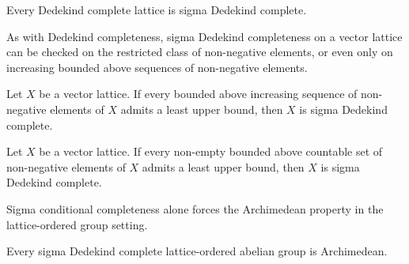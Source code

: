 \begin{lemma}
\label{lem:conditionallyCompleteLattice-toSigmaConditionallyCompleteLattice}
\leanok
{}
Every Dedekind complete lattice is sigma Dedekind complete.
\end{lemma}

As with Dedekind completeness, sigma Dedekind completeness on a
vector lattice can be checked on the restricted class of non-negative
elements, or even only on increasing bounded above sequences of
non-negative elements.

\begin{theorem}
\label{thm:sigmaConditionallyCompleteLatticeOfPosSeq}
\leanok
{}
Let $X$ be a vector lattice. If every bounded above increasing
sequence of non-negative elements of $X$ admits a least upper bound,
then $X$ is sigma Dedekind complete.
\end{theorem}

\begin{theorem}
\label{thm:sigmaConditionallyCompleteLatticeOfPosCountableSet}
\leanok
{}
Let $X$ be a vector lattice. If every non-empty bounded above
countable set of non-negative elements of $X$ admits a least upper
bound, then $X$ is sigma Dedekind complete.
\end{theorem}

Sigma conditional completeness alone forces the Archimedean
property in the lattice-ordered group setting.

\begin{theorem}
\label{thm:isVLArchimedean-of-sigmaConditionallyCompleteLattice}
\leanok
{}
Every sigma Dedekind complete lattice-ordered abelian group is
Archimedean.
\end{theorem}

